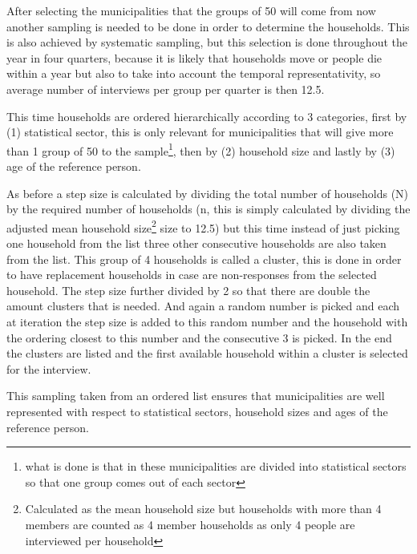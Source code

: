 After selecting the municipalities that the groups of 50 will come from now another sampling is needed to be done in order to determine the households. This is also achieved by systematic sampling, but this selection is done throughout the year in four quarters, because it is likely that households move or people die within a year but also to take into account the temporal representativity, so average number of interviews per group per quarter is then 12.5.

This time households are ordered hierarchically according to 3 categories, first by (1) statistical sector, this is only relevant for municipalities that will give more than 1 group of 50 to the 
sample\footnote{what is done is that in these municipalities are divided into statistical sectors so that one group comes out of each sector}, then by (2) household size and lastly by (3) age of the reference person.

As before a step size is calculated by dividing the total number of households (N) by the required number of households (n, this is simply calculated by dividing the adjusted mean household size\footnote{Calculated as the mean household size but households with more than 4 members are counted as 4 member households as only 4 people are interviewed per household} size to 12.5) but this time instead of just picking one household from the list three other consecutive households are also taken from the list. This group of 4 households is called a cluster, this is done in order to have replacement households in case are non-responses from the selected household. The step size further divided by 2 so that there are double the amount clusters that is needed. And again a random number is picked and each at iteration the step size is added to this random number and the household with the ordering closest to this number and the consecutive 3 is picked. In the end the clusters are listed and the first available household within a cluster is selected for the interview.

This sampling taken from an ordered list ensures that municipalities are well represented with respect to statistical sectors, household sizes and ages of the reference person. 

